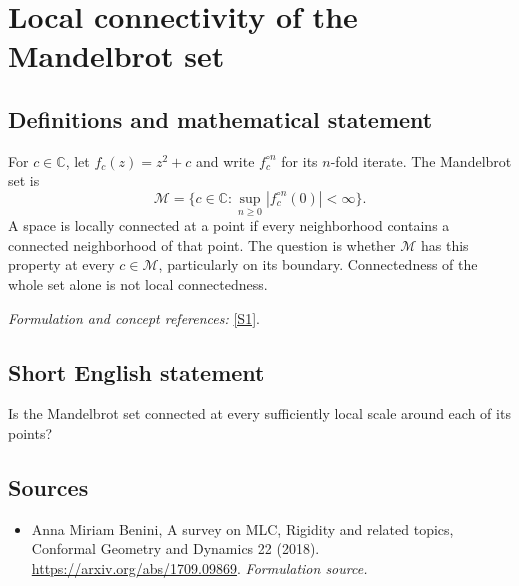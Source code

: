 \documentclass[11pt]{article}
\begin{document}
\section*{\texorpdfstring{Local connectivity of the Mandelbrot set}{Local connectivity of the Mandelbrot set}}\label{5300012}
\subsection{Definitions and mathematical statement}
For $c\in{\mathbb{C}}$, let $f_c(z)=z^2+c$ and write $f_c^{\circ n}$ for its $n$-fold iterate. The Mandelbrot set is
\[
 \mathcal M=\{c\in{\mathbb{C}}:\sup_{n\ge0}|f_c^{\circ n}(0)|<\infty\}.
\]
A space is locally connected at a point if every neighborhood contains a connected neighborhood of that point. The question is whether $\mathcal M$ has this property at every $c\in\mathcal M$, particularly on its boundary. Connectedness of the whole set alone is not local connectedness.
\par\smallskip\textit{Formulation and concept references:} \href{https://arxiv.org/abs/1709.09869}{[S1]}.

\subsection{Short English statement}
Is the Mandelbrot set connected at every sufficiently local scale around each of its points?
\subsection{Sources}
\begin{itemize}
\item[S1]Anna Miriam Benini, A survey on MLC, Rigidity and related topics, Conformal Geometry and Dynamics 22 (2018).
\url{https://arxiv.org/abs/1709.09869}.
\textit{Formulation source.}
\end{itemize}
\end{document}
